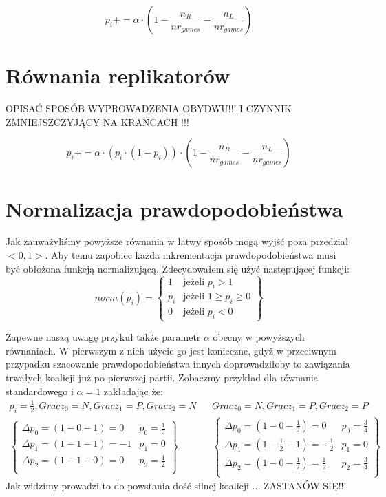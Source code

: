 \begin{equation} \label{eq:stand}
p_i += \alpha \cdot (1 - \frac{n_R}{nr_{games}} - \frac{n_L}{nr_{games}})
\end{equation}

\section{Równania replikatorów}
\label{sec:r_repli}

OPISAĆ SPOSÓB WYPROWADZENIA OBYDWU!!! I CZYNNIK ZMNIEJSZCZYJĄCY NA KRAŃCACH !!!

\begin{equation} \label{eq:repli}
p_i += \alpha \cdot (p_i \cdot (1 - p_i)) \cdot (1 - \frac{n_R}{nr_{games}} - \frac{n_L}{nr_{games}})
\end{equation}

\section{Normalizacja prawdopodobieństwa}
\label{sec:normalizacja}
Jak zauważyliśmy powyższe równania w łatwy sposób mogą wyjść poza przedział $<0,1>$. Aby temu zapobiec każda inkrementacja prawdopodobieństwa musi być obłożona funkcją normalizującą. Zdecydowałem się użyć następującej funkcji:
\begin{displaymath}
norm(p_i) = \left\{
\begin{array}{ll}
1 & \text{jeżeli } p_i > 1 \\
p_i & \text{jeżeli } 1 \geq p_i \geq 0 \\
0 & \text{jeżeli } p_i < 0
\end{array} 
\right\}
\end{displaymath}

Zapewne naszą uwagę przykuł także parametr $\alpha$ obecny w powyższych równaniach. W pierwszym z nich użycie go jest konieczne, gdyż w przeciwnym przypadku szacowanie prawdopodobieństwa innych doprowadziłoby to zawiązania trwałych koalicji już po pierwszej partii. Zobaczmy przykład dla równania standardowego i $\alpha = 1$ zakładając że:
\begin{align*}
p_i = \frac{1}{2}, Gracz_0 = N, Gracz_1 = P, Gracz_2 = N && Gracz_0 = N, Gracz_1 = P, Gracz_2 = P\\
\left\{
\begin{array}{ll}
\Delta p_0 = (1 - 0 - 1) =  0 & p_0=\frac{1}{2}\\
\Delta p_1 = (1 - 1 - 1) =  -1 & p_1= 0\\
\Delta p_2 = (1 - 1 - 0) =  0 & p_2=\frac{1}{2}\\
\end{array} 
\right\} &&
\left\{
\begin{array}{ll}
\Delta p_0 = (1 - 0 - \frac{1}{2}) =  0 & p_0=\frac{3}{4}\\
\Delta p_1 = (1 - \frac{1}{2} - 1) =  -\frac{1}{2} & p_1= 0\\
\Delta p_2 = (1 - 0 - \frac{1}{2}) =  \frac{1}{2} & p_2=\frac{3}{4}\\
\end{array}
\right\}
\end{align*}
Jak widzimy prowadzi to do powstania dość silnej koalicji ... ZASTANÓW SIĘ!!!